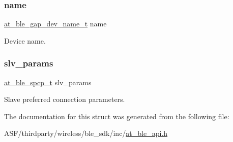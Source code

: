\subsubsection{\texorpdfstring{name}{name}}
{\footnotesize\ttfamily \mbox{\hyperlink{structat__ble__gap__dev__name__t}{at\+\_\+ble\+\_\+gap\+\_\+dev\+\_\+name\+\_\+t}} name}



Device name. 

\mbox{\label{structat__ble__gap__deviceinfo__t_a4bc48c20ac9f987e7c458fa3bca69e7b}} 
\subsubsection{\texorpdfstring{slv\_params}{slv\_params}}
{\footnotesize\ttfamily \mbox{\hyperlink{structat__ble__spcp__t}{at\+\_\+ble\+\_\+spcp\+\_\+t}} slv\+\_\+params}



Slave preferred connection parameters. 



The documentation for this struct was generated from the following file\+:\begin{DoxyCompactItemize}
\item 
A\+S\+F/thirdparty/wireless/ble\+\_\+sdk/inc/\mbox{\hyperlink{at__ble__api_8h}{at\+\_\+ble\+\_\+api.\+h}}\end{DoxyCompactItemize}
